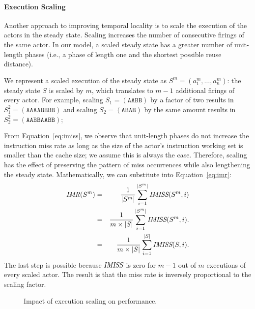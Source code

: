 \documentclass{sigplanconf}
\newcommand{\mt}[1]{\mbox{\it #1}}
\begin{document}
\paragraph*{Execution Scaling}
Another approach to improving temporal locality is to scale the
execution of the actors in the steady state. Scaling increases the
number of consecutive firings of the same actor. In our model, a
scaled steady state has a greater number of unit-length phases (i.e., a
phase of length one and the shortest possible reuse distance).

We represent a scaled execution of the steady state as
$S^m=(a_1^m,\dots, a_n^m)$: the steady state $S$ is scaled by $m$, which
translates to $m-1$ additional firings of 
every actor. For example, scaling $S_1=(\texttt{AABB})$ by a factor of
two results in
$S_1^2=(\texttt{AAAABBBB})$
and scaling $S_2=(\texttt{ABAB})$ by the same amount results in 
$S_2^2=(\texttt{AABBAABB})$;

From Equation~\ref{eq:imiss}, we observe that unit-length phases do
not increase the instruction miss rate  as long as the size of the actor's 
instruction working set  is smaller than the cache
size; we assume this is always the case. Therefore, scaling has the
effect of preserving the pattern of 
miss occurrences while also lengthening the steady state. Mathematically,
we can substitute into Equation~\ref{eq:imr}:
\begin{eqnarray}
  \nonumber
  \mt{IMR}(S^m)  &=& \frac{1}{|S^m|}\sum_{i=1}^{|S^m|} \mt{IMISS}(S^m,i) \\
  \nonumber
                 &=& \frac{1}{m \times |S|}\sum_{i=1}^{|S^m|} \mt{IMISS}(S^m,i). \\
  \label{eq:imrM}
                 &=& \frac{1}{m \times |S|}\sum_{i=1}^{|S|} \mt{IMISS}(S,i).
\end{eqnarray}
The last step is possible because $\mt{IMISS}$ is zero for $m-1$ out
of $m$ executions of every scaled actor.  The result is that the miss
rate is inversely proportional to the scaling factor.
\begin{figure}[t]
\begin{center}
  \caption{Impact of execution scaling on performance.}
 \label{fig:scaling-data}
\end{center}
\end{figure}
\end{document}
